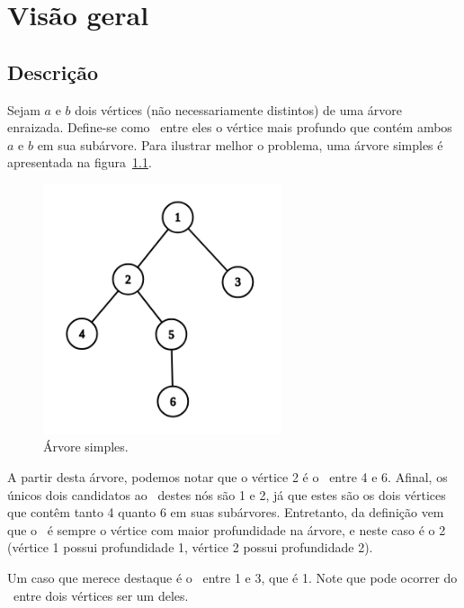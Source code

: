 \chapter{Visão geral}
\label{cap:visao-geral}

\section{Descrição}

Sejam $a$ e $b$ dois vértices (não necessariamente distintos) de uma árvore enraizada. Define-se como \LCA\ entre eles o vértice mais profundo que contém ambos $a$ e $b$ em sua subárvore. Para ilustrar melhor o problema, uma árvore simples é apresentada na figura~\ref{fig:grafo-simples}.

\begin{figure}[htb]
\begin{center}
\includegraphics[width=7cm]{images/graph}
\end{center}
\caption{\label{fig:grafo-simples}Árvore simples.}
\end{figure}

A partir desta árvore, podemos notar que o vértice 2 é o \LCA\ entre 4 e 6. Afinal, os únicos dois candidatos ao \LCA\ destes nós são 1 e 2, já que estes são os dois vértices que contêm tanto 4 quanto 6 em suas subárvores. Entretanto, da definição vem que o \LCA\ é sempre o vértice com maior profundidade na árvore, e neste caso é o 2 (vértice 1 possui profundidade 1, vértice 2 possui profundidade 2).

Um caso que merece destaque é o \LCA\ entre 1 e 3, que é 1. Note que pode ocorrer do \LCA\ entre dois vértices ser um deles.

\vspace{50px}

